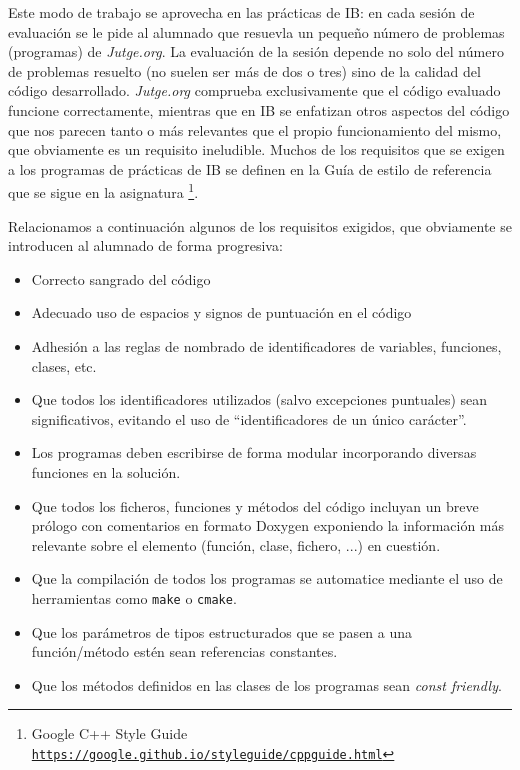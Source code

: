 \documentclass[twocolumn,twoside,a4paper, 10pt]{article}
\newcommand{\jutge}{\textit{Jutge.org}{}}           %
\begin{document}
Este modo de trabajo se aprovecha en las prácticas de IB: en cada sesión de evaluación se le pide al alumnado
que resuevla un pequeño número de problemas (programas) de \jutge{}.
La evaluación de la sesión depende no solo del número de problemas resuelto (no suelen ser más de dos o tres)
sino de la calidad del código desarrollado.
\jutge{} comprueba exclusivamente que el código evaluado funcione correctamente, mientras que en IB se
enfatizan otros aspectos del código que nos parecen tanto o más relevantes que el propio funcionamiento del
mismo, que obviamente es un requisito ineludible.
Muchos de los requisitos que se exigen a los programas de prácticas de IB se definen en la Guía de estilo de 
referencia que se sigue en la asignatura 
\footnote{Google C++ Style Guide\\ \href{https://google.github.io/styleguide/cppguide.html}{\scriptsize{\texttt{https://google.github.io/styleguide/cppguide.html}}}}.

Relacionamos a continuación algunos de los requisitos exigidos, que obviamente se introducen al alumnado de
forma progresiva:
\begin{itemize}
\item Correcto sangrado del código
\item Adecuado uso de espacios y signos de puntuación en el código
\item Adhesión a las reglas de nombrado de identificadores de variables, funciones, clases, etc.
\item Que todos los identificadores utilizados (salvo excepciones puntuales) sean significativos, evitando el
  uso de ``identificadores de un único carácter''.
\item Los programas deben escribirse de forma modular incorporando diversas funciones en la solución.
\item Que todos los ficheros, funciones y métodos del código incluyan un breve prólogo con comentarios en
  formato Doxygen exponiendo la información más relevante sobre el elemento (función, clase, fichero, ...) en
    cuestión.
\item Que la compilación de todos los programas se automatice mediante el uso de herramientas como
  \texttt{make} o \texttt{cmake}.
\item Que los parámetros de tipos estructurados que se pasen a una función/método estén sean referencias
  constantes.
\item Que los métodos definidos en las clases de los programas sean \textit{const friendly}.
\end{itemize}
\end{document}
